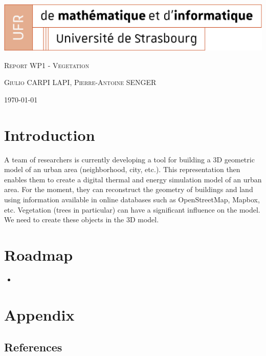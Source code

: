 \documentclass[11pt]{article}
\begin{document}
\begin{titlepage}
    \centering
    \includegraphics[width=1\textwidth]{images/logo_Uni.png}\par\vspace{1cm}
    {\scshape\Large Report WP1 - Vegetation \par}
    \vspace{1cm}
    {\scshape\large Giulio CARPI LAPI, Pierre-Antoine SENGER\par}
    \vspace{1cm}
    {\large \today\par}
\end{titlepage}
 
\tableofcontents %

\newpage %

\section{Introduction}

A team of researchers is currently developing a tool for building a 3D geometric model of an urban area (neighborhood, city, etc.).
This representation then enables them to create a digital thermal and energy simulation model of an urban area.
For the moment, they can reconstruct the geometry of buildings and land using information available in online databases such as OpenStreetMap, Mapbox, etc.
Vegetation (trees in particular) can have a significant influence on the model. We need to create these objects in the 3D model.

\section{Roadmap}
\begin{itemize}
	\item 
\end{itemize}


\newpage
\section{Appendix}
\subsection{References}
\nocite{*}
\end{document}
